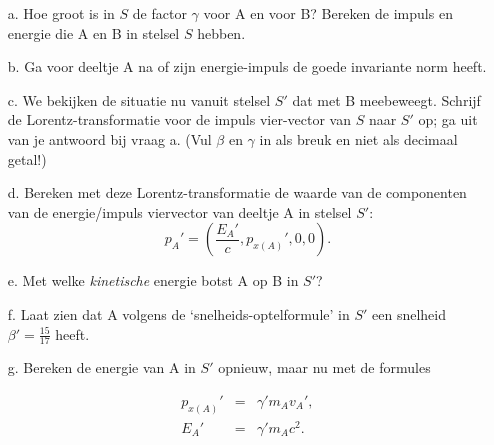 			\begin{enumerate}
			\item[a.] Hoe groot is in $S$ de factor $\gamma$ voor A en voor B? Bereken de impuls en energie die A en B in stelsel $S$ hebben.
			\item[b.] Ga voor deeltje A na of zijn energie-impuls de goede invariante norm heeft.
			\item[c.] We bekijken de situatie nu vanuit stelsel $S'$ dat met B meebeweegt. Schrijf de Lorentz-transformatie voor de impuls vier-vector van $S$ naar $S'$ op; ga uit van je antwoord bij vraag a. (Vul $\beta$ en $\gamma$ in als breuk en niet als decimaal getal!)
			\item[d.] Bereken met deze Lorentz-transformatie de waarde van de componenten van de energie/impuls viervector van deeltje A in stelsel $S'$: 
			\begin{equation} p_A' = (\frac{E_A'}{c},p_{x(A)}',0,0).  \end{equation}
			 
			\item[e.] Met welke \textit{kinetische} energie botst A op B in $S'$?
			\item[f.] Laat zien dat A volgens de `snelheids-optelformule' in $S'$ een snelheid $\beta' = \frac{15}{17}$ heeft.
			\item[g.] Bereken de energie van A in $S'$ opnieuw, maar nu met de formules 
			
			\begin{eqnarray}
				p_{x(A)}' &=& \gamma' m_A v_A', \\
				E_A' &=& \gamma' m_A c^2. \nonumber
				\label{eq:}
			\end{eqnarray} 
		
		\end{enumerate}


